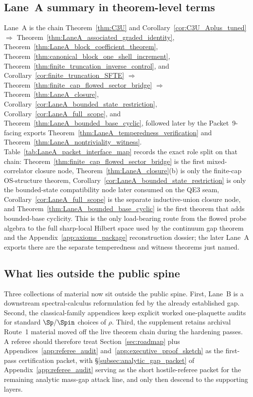 \subsection{Lane~A summary in theorem-level terms}

Lane~A is the chain Theorem~\ref{thm:C3U} and Corollary~\ref{cor:C3U_Aplus_tuned} $\Longrightarrow$ Theorem~\ref{thm:LaneA_associated_graded_identity}, Theorem~\ref{thm:LaneA_block_coefficient_theorem}, Theorem~\ref{thm:canonical_block_one_shell_increment}, Theorem~\ref{thm:finite_truncation_inverse_control}, and Corollary~\ref{cor:finite_truncation_SFTE} $\Longrightarrow$ Theorem~\ref{thm:finite_cap_flowed_sector_bridge} $\Longrightarrow$ Theorem~\ref{thm:LaneA_closure}, Corollary~\ref{cor:LaneA_bounded_state_restriction}, Corollary~\ref{cor:LaneA_full_scope}, and Theorem~\ref{thm:LaneA_bounded_base_cyclic}, followed later by the Packet~9-facing exports Theorem~\ref{thm:LaneA_temperedness_verification} and Theorem~\ref{thm:LaneA_nontriviality_witness}.
Table~\ref{tab:LaneA_packet_interface_map} records the exact role split on that chain: Theorem~\ref{thm:finite_cap_flowed_sector_bridge} is the first mixed-correlator closure node, Theorem~\ref{thm:LaneA_closure}(b) is only the finite-cap OS-structure theorem, Corollary~\ref{cor:LaneA_bounded_state_restriction} is only the bounded-state compatibility node later consumed on the QE3 seam, Corollary~\ref{cor:LaneA_full_scope} is the separate inductive-union closure node, and Theorem~\ref{thm:LaneA_bounded_base_cyclic} is the first theorem that adds bounded-base cyclicity.
This is the only load-bearing route from the flowed probe algebra to the full sharp-local Hilbert space used by the continuum gap theorem and the Appendix~\ref{app:axioms_package} reconstruction dossier; the later Lane~A exports there are the separate temperedness and witness theorems just named.

\subsection{What lies outside the public spine}

Three collections of material now sit outside the public spine.
First, Lane~B is a downstream spectral-calculus reformulation fed by the already established gap.
Second, the classical-family appendices keep explicit worked one-plaquette audits for standard $\Sp/\Spin$ choices of $\rho$.
Third, the supplement retains archival Route~1 material moved off the live theorem chain during the hardening passes.
A referee should therefore treat Section~\ref{sec:roadmap} plus Appendices~\ref{app:referee_audit} and~\ref{app:executive_proof_sketch} as the first-pass certification packet, with \S\ref{subsec:analytic_gap_packet} of Appendix~\ref{app:referee_audit} serving as the short hostile-referee packet for the remaining analytic mass-gap attack line, and only then descend to the supporting layers.